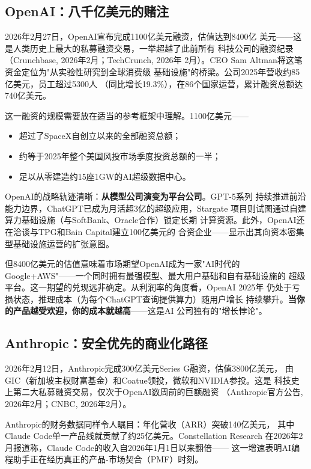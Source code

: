 \subsection{OpenAI：八千亿美元的赌注}
\label{subsec:openai-recap}

2026年2月27日，OpenAI宣布完成1100亿美元融资，估值达到8400亿
美元——这是人类历史上最大的私募融资交易，一举超越了此前所有
科技公司的融资纪录（Crunchbase, 2026年2月；TechCrunch, 2026年
2月）。CEO Sam Altman将这笔资金定位为"从实验性研究到全球消费级
基础设施"的桥梁。公司2025年营收约85亿美元，员工超过5300人
（同比增长19.3\%），在86个国家运营，累计融资总额达740亿美元。

这一融资的规模需要放在适当的参考框架中理解。1100亿美元——
\begin{itemize}
  \item 超过了SpaceX自创立以来的全部融资总额；
  \item 约等于2025年整个美国风投市场季度投资总额的一半；
  \item 足以从零建造约15座1GW的AI超级数据中心。
\end{itemize}

OpenAI的战略轨迹清晰：\textbf{从模型公司演变为平台公司}。GPT-5系列
持续推进前沿能力边界，ChatGPT已成为月活超3亿的超级应用，Stargate
项目则试图通过自建算力基础设施（与SoftBank、Oracle合作）锁定长期
计算资源。此外，OpenAI还在洽谈与TPG和Bain Capital建立100亿美元的
合资企业——显示出其向资本密集型基础设施运营的扩张意图。

但8400亿美元的估值意味着市场期望OpenAI成为一家"AI时代的
Google+AWS"——一个同时拥有最强模型、最大用户基础和自有基础设施的
超级平台。这一期望的兑现远非确定。从利润率的角度看，OpenAI 2025年
仍处于亏损状态，推理成本（为每个ChatGPT查询提供算力）随用户增长
持续攀升。\textbf{当你的产品越受欢迎，你的成本就越高}——这是AI
公司独有的"增长悖论"。

\subsection{Anthropic：安全优先的商业化路径}
\label{subsec:anthropic-recap}

2026年2月12日，Anthropic完成300亿美元Series G融资，估值3800亿美元，
由GIC（新加坡主权财富基金）和Coatue领投，微软和NVIDIA参投。这是
科技史上第二大私募融资交易，仅次于OpenAI数周前的巨额融资
（Anthropic官方公告, 2026年2月；CNBC, 2026年2月）。

Anthropic的财务数据同样令人瞩目：年化营收（ARR）突破140亿美元，
其中Claude Code单一产品线就贡献了约25亿美元。Constellation Research
在2026年2月报道称，Claude Code的收入自2026年1月1日以来翻倍——
这一增速表明AI编程助手正在经历真正的产品-市场契合（PMF）时刻。

